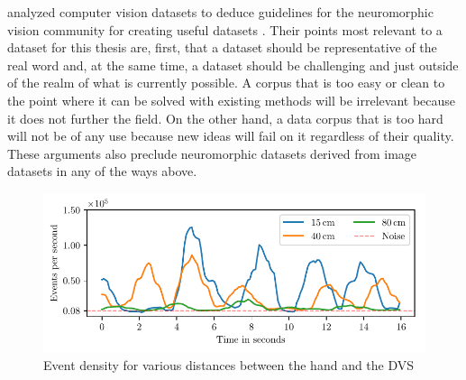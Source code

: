 \citeauthor{tan2015benchmarking} analyzed computer vision datasets to deduce
guidelines for the neuromorphic vision community for creating useful datasets
\cite{tan2015benchmarking}. Their points most relevant to a dataset for this
thesis are, first, that a dataset should be representative of the real word and,
at the same time, a dataset should be challenging and just outside of the realm
of what is currently possible. A corpus that is too easy or clean to the point
where it can be solved with existing methods will be irrelevant because it does
not further the field. On the other hand, a data corpus that is too hard will
not be of any use because new ideas will fail on it regardless of their quality.
These arguments also preclude neuromorphic datasets derived from image datasets
in any of the ways above.

\begin{figure}[h]
  \centering
  \includegraphics{figures/dataset/densities}
  \caption{Event density for various distances between the hand and the DVS}
  \label{fig:densities}
\end{figure}

